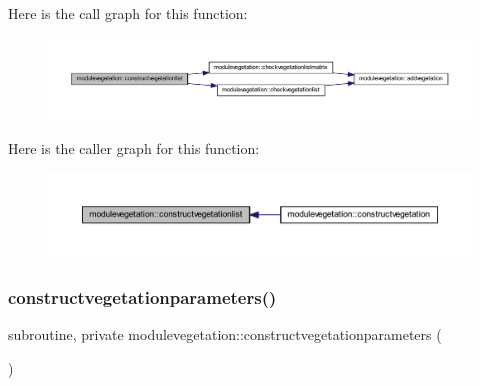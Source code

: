 Here is the call graph for this function\+:\nopagebreak
\begin{figure}[H]
\begin{center}
\leavevmode
\includegraphics[width=350pt]{namespacemodulevegetation_a73de44a26d2dff28225fc8df134023fc_cgraph}
\end{center}
\end{figure}
Here is the caller graph for this function\+:\nopagebreak
\begin{figure}[H]
\begin{center}
\leavevmode
\includegraphics[width=350pt]{namespacemodulevegetation_a73de44a26d2dff28225fc8df134023fc_icgraph}
\end{center}
\end{figure}
\mbox{\label{namespacemodulevegetation_a11da2d592ded0bd3811f9e90de324046}} 
\subsubsection{\texorpdfstring{constructvegetationparameters()}{constructvegetationparameters()}}
{\footnotesize\ttfamily subroutine, private modulevegetation\+::constructvegetationparameters (\begin{DoxyParamCaption}{ }\end{DoxyParamCaption})\hspace{0.3cm}{\ttfamily [private]}}

